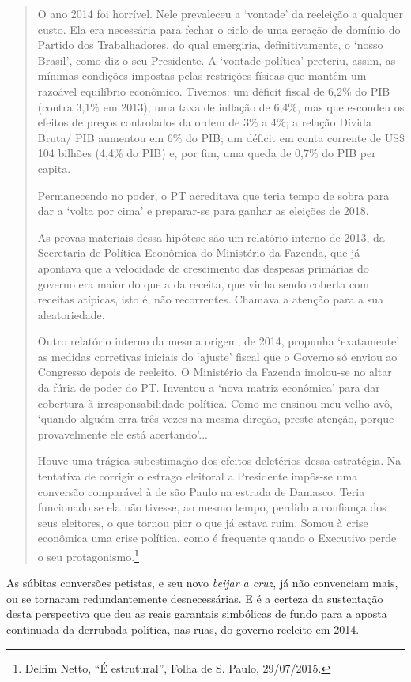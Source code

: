 \begin{quote}
O ano 2014 foi horrível. Nele prevaleceu a `vontade' da reeleição a
qualquer custo. Ela era necessária para fechar o ciclo de uma geração de
domínio do Partido dos Trabalhadores, do qual emergiria,
definitivamente, o `nosso Brasil', como diz o seu Presidente. A `vontade
política' preteriu, assim, as mínimas condições impostas pelas
restrições físicas que mantêm um razoável equilíbrio econômico. Tivemos:
um déficit fiscal de 6,2\% do PIB (contra 3,1\% em 2013); uma taxa de
inflação de 6,4\%, mas que escondeu os efeitos de preços controlados da
ordem de 3\% a 4\%; a relação Dívida Bruta/ PIB aumentou em 6\% do PIB;
um déficit em conta corrente de US\$ 104 bilhões (4,4\% do PIB) e, por
fim, uma queda de 0,7\% do PIB per capita.

Permanecendo no poder, o PT acreditava que teria tempo de sobra para dar
a `volta por cima' e preparar-se para ganhar as eleições de 2018.

As provas materiais dessa hipótese são um relatório interno de 2013, da
Secretaria de Política Econômica do Ministério da Fazenda, que já
apontava que a velocidade de crescimento das despesas primárias do
governo era maior do que a da receita, que vinha sendo coberta com
receitas atípicas, isto é, não recorrentes. Chamava a atenção para a sua
aleatoriedade.

Outro relatório interno da mesma origem, de 2014, propunha `exatamente'
as medidas corretivas iniciais do `ajuste' fiscal que o Governo só
enviou ao Congresso depois de reeleito. O Ministério da Fazenda
imolou-se no altar da fúria de poder do PT. Inventou a `nova matriz
econômica' para dar cobertura à irresponsabilidade política. Como me
ensinou meu velho avô, `quando alguém erra três vezes na mesma direção,
preste atenção, porque provavelmente ele está acertando'...

Houve uma trágica subestimação dos efeitos deletérios dessa estratégia.
Na tentativa de corrigir o estrago eleitoral a Presidente impôs-se uma
conversão comparável à de são Paulo na estrada de Damasco. Teria
funcionado se ela não tivesse, ao mesmo tempo, perdido a confiança dos
seus eleitores, o que tornou pior o que já estava ruim. Somou à crise
econômica uma crise política, como é frequente quando o Executivo perde
o seu protagonismo.\footnote{Delfim Netto, ``É estrutural'', Folha de
  S. Paulo, 29/07/2015.}
\end{quote} 


As súbitas conversões petistas, e seu novo \emph{beijar a cruz}, já não
convenciam mais, ou se tornaram redundantemente desnecessárias. E é a
certeza da sustentação desta perspectiva que deu as reais garantais
simbólicas de fundo para a aposta continuada da derrubada política, nas
ruas, do governo reeleito em 2014.


